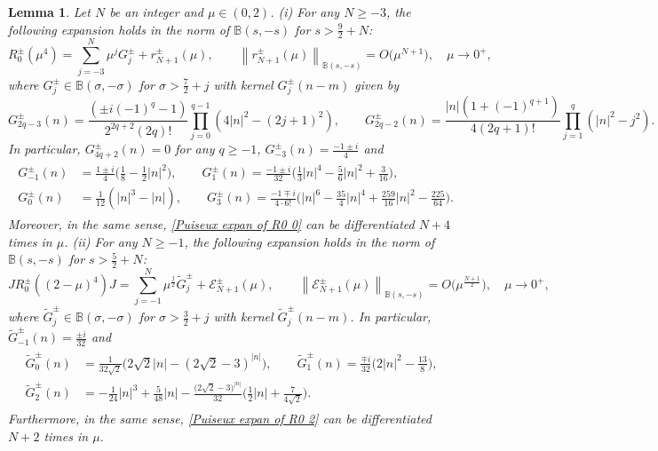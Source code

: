 \documentclass[10pt,a4paper]{amsart}
\newtheorem{lemma}[definition]{Lemma}
\newcommand\B{\mathbb{B}}
\newcommand\mcaE{\mathcal{E}}
\numberwithin{equation}{section}
\begin{document}
\setcounter{section}{5}
\setcounter{equation}{0}
\setcounter{definition}{0}
\begin{lemma}\label{Puiseux expan of R0}
Let $N$ be an integer and $\mu\in(0,2)$. 
\vskip0.1cm
{\rm (i)} For any $N\geq-3$, the following expansion holds in the norm of $\B(s,-s)$ for $s>\frac{9}{2}+N$:
\begin{equation}\label{Puiseux expan of R0 0}
R^{\pm}_0(\mu^4)=\sum\limits_{j=-3}^{N}\mu^{j}G^{\pm}_j+r^{\pm}_{N+1}(\mu),\qquad \left\|r^{\pm}_{N+1}(\mu)\right\|_{\B(s,-s)}=O\big(\mu^{N+1}\big),\quad\mu\rightarrow0^+,
\end{equation}
where $G^{\pm}_j\in\B(\sigma,-\sigma)$ for $\sigma>\frac{7}{2}+j$ with kernel $G^{\pm}_j(n-m)$ given by 
\begin{equation*}
   G^{\pm}_{2q-3}(n)= \frac{(\pm i(-1)^q-1)}{2^{2q+2}(2q)!}\prod\limits_{j=0}^{q-1}(4|n|^2-(2j+1)^2),\qquad  G^\pm_{2q-2}(n)=\frac{|n|(1+(-1)^{q+1})}{4(2q+1)!}\prod\limits_{j=1}^{q}(|n|^2-j^2).
\end{equation*}
In particular, $G^{\pm}_{4q+2}(n)=0$ for any $q\geq-1$, $G^{\pm}_{-3}(n)=\frac{-1\pm i}{4}$ and 
\begin{align}\label{expan coeffie of Gpm}
\begin{split}
  G^{\pm}_{-1}(n)&=\frac{1\pm i}{4}\big(\frac{1}{8}-\frac{1}{2}|n|^2\big), \qquad G^{\pm}_{1}(n)=\frac{-1\pm i}{32}\big(\frac{1}{3}|n|^4-\frac{5}{6}|n|^2+\frac{3}{16}\big), \\
 G^{\pm}_{0}(n)&=\frac{1}{12}\left(|n|^3-|n|\right), \qquad G^{\pm}_{3}(n)=\frac{-1\mp i}{4\cdot6!}\big(|n|^6-\frac{35}{4}|n|^4+\frac{259}{16}|n|^2-\frac{225}{64}\big).
\end{split}
\end{align}
Moreover, in the same sense, \eqref{Puiseux expan of R0 0} can be differentiated $N+4$ times in $\mu$.
\vskip0.2cm
{\rm(ii)}
For any $N\geq-1$, the following expansion holds in the norm of $\B(s,-s)$ for $s>\frac{5}{2}+N$:
\begin{equation}\label{Puiseux expan of R0 2}
JR^{\pm}_0((2-\mu)^4)J=\sum\limits_{j=-1}^{N}\mu^{\frac{j}{2}}\widetilde{G}^{\pm}_j+\mcaE^{\pm}_{N+1}(\mu),\qquad \left\|\mcaE^{\pm}_{N+1}(\mu)\right\|_{\B(s,-s)}=O\big(\mu^{\frac{N+1}{2}}\big),\quad \mu\rightarrow0^+,
\end{equation}
where $\widetilde{G}^{\pm}_j\in\B(\sigma,-\sigma)$ for $\sigma>\frac{3}{2}+j$ with kernel $\widetilde{G}^{\pm}_j(n-m)$. In particular, $\widetilde{G}^{\pm}_{-1}(n)=\frac{\pm i}{32}$ and
\begin{align}\label{expan coeffie of Gtutapm}
\begin{split}
\widetilde{G}^{\pm}_{0}(n)&=\frac{1}{32\sqrt2}\big(2\sqrt2|n|-{(2\sqrt2-3)}^{|n|}\big),\qquad  \widetilde{G}^{\pm}_{1}(n)=\frac{\mp i}{32}\big(2|n|^2-\frac{13}{8}\big),\\
\widetilde{G}^{\pm}_{2}(n)&=-\frac{1}{24}|n|^3+\frac{5}{48}|n|-\frac{\big(2\sqrt2-3\big)^{|n|}}{32}\Big(\frac{1}{2}|n|+\frac{7}{4\sqrt2}\Big).
\end{split}
\end{align}
Furthermore, in the same sense, \eqref{Puiseux expan of R0 2} can be differentiated $N+2$ times in $\mu$.
\end{lemma}
\end{document}

